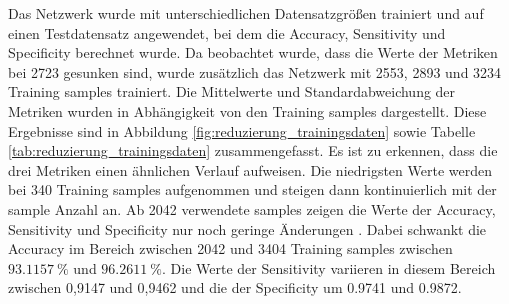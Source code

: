 Das Netzwerk wurde mit unterschiedlichen Datensatzgrößen trainiert und auf einen Testdatensatz angewendet, bei dem die Accuracy, Sensitivity und Specificity berechnet wurde.
Da beobachtet wurde, dass die Werte der Metriken bei 2723 gesunken sind, wurde zusätzlich das Netzwerk mit 2553, 2893 und 3234 
Training samples trainiert.
Die Mittelwerte und Standardabweichung der Metriken wurden in Abhängigkeit von den Training samples dargestellt.
Diese Ergebnisse sind in Abbildung \ref{fig:reduzierung_trainingsdaten} sowie Tabelle \ref{tab:reduzierung_trainingsdaten} zusammengefasst.
Es ist zu erkennen, dass die drei Metriken einen ähnlichen Verlauf aufweisen.
Die niedrigsten Werte werden bei 340 Training samples aufgenommen und steigen dann kontinuierlich mit der sample Anzahl an.
Ab 2042 verwendete samples zeigen die Werte der Accuracy, Sensitivity und Specificity nur noch geringe Änderungen  .
Dabei schwankt die Accuracy im Bereich zwischen 2042 und 3404 Training samples zwischen $\qty{93.1157}{\%}$ und $\qty{96.2611}{\%}$. 
Die Werte der Sensitivity variieren in diesem Bereich zwischen 0,9147 und 0,9462 und die der Specificity um \SI{0,9741}{} und \SI{0,9872}{}.
